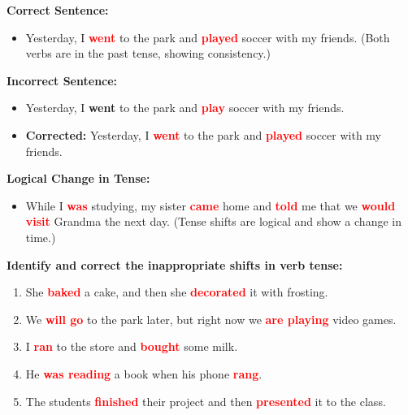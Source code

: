 \documentclass[12pt]{article}
\begin{document}
\begin{tcolorbox}[colframe=black!60, colback=white, 
coltitle=black, colbacktitle=black!15, fonttitle=\bfseries\Large, 
title=Examples, halign title=center, left=10pt, right=10pt, top=10pt, bottom=15pt]

\textbf{Correct Sentence:}
\begin{itemize}
    \item Yesterday, I \textbf{\textcolor{red}{went}} to the park and \textbf{\textcolor{red}{played}} soccer with my friends. (Both verbs are in the past tense, showing consistency.)
\end{itemize}

\textbf{Incorrect Sentence:}
\begin{itemize}
    \item Yesterday, I \textbf{went} to the park and \textbf{\textcolor{red}{play}} soccer with my friends. 
    \item \textbf{Corrected:} Yesterday, I \textbf{\textcolor{red}{went}} to the park and \textbf{\textcolor{red}{played}} soccer with my friends.
\end{itemize}

\textbf{Logical Change in Tense:}
\begin{itemize}
    \item While I \textbf{\textcolor{red}{was}} studying, my sister \textbf{\textcolor{red}{came}} home and \textbf{\textcolor{red}{told}} me that we \textbf{\textcolor{red}{would visit}} Grandma the next day. (Tense shifts are logical and show a change in time.)
\end{itemize}

\end{tcolorbox}

\vspace{1em}

\begin{tcolorbox}[colframe=black!60, colback=white, 
coltitle=black, colbacktitle=black!15, fonttitle=\bfseries\Large, 
title=Guided Practice, halign title=center, left=10pt, right=10pt, top=10pt, bottom=15pt]
\textbf{Identify and correct the inappropriate shifts in verb tense:}
\begin{enumerate}[itemsep=3em]
    \item She \textbf{\textcolor{red}{baked}} a cake, and then she \textbf{\textcolor{red}{decorated}} it with frosting.
    \item We \textbf{\textcolor{red}{will go}} to the park later, but right now we \textbf{\textcolor{red}{are playing}} video games.
    \item I \textbf{\textcolor{red}{ran}} to the store and \textbf{\textcolor{red}{bought}} some milk.
    \item He \textbf{\textcolor{red}{was reading}} a book when his phone \textbf{\textcolor{red}{rang}}.
    \item The students \textbf{\textcolor{red}{finished}} their project and then \textbf{\textcolor{red}{presented}} it to the class.
\end{enumerate}
\end{tcolorbox}
\end{document}
